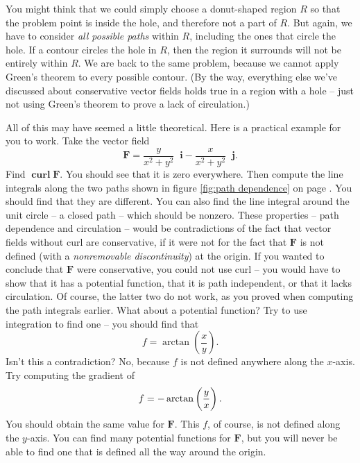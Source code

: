 \documentclass{myarticle}
\DeclareMathOperator{\curl}{\mathbf{curl}}
\renewcommand{\vec}[1]{\mathbf{#1}}
\newcommand{\unitvector}[1]{
  \mathop{}\!\vec{#1}
}
\newcommand{\ih}{\unitvector{i}}
\newcommand{\jh}{\unitvector{j}}
\theoremstyle{nospace}
\newtheorem{old series theorem}{Theorem}
\newenvironment{series theorem}
{\begin{mdframed}\begin{old series theorem}}
    {\end{old series theorem}\end{mdframed}}
\begin{document}
You might think that we could simply choose a donut-shaped region $R$
so that the problem point is inside the hole, and therefore not a part
of $R$. But again, we have to consider \emph{all possible paths}
within $R$, including the ones that circle the hole. If a contour
circles the hole in $R$, then the region it surrounds will not be
entirely within $R$. We are back to the same problem, because we
cannot apply Green's theorem to every possible contour. (By the way,
everything else we've discussed about conservative vector fields holds
true in a region with a hole -- just not using Green's theorem to
prove a lack of circulation.)

All of this may have seemed a little theoretical. Here is a practical
example for you to work. Take the vector field
\[
  \vec{F} = \frac{y}{x^2 + y^2} \ih - \frac{x}{x^2 + y^2} \jh.
\]
Find $\curl \vec{F}$. You should see that it is zero everywhere. Then
compute the line integrals along the two paths shown in figure
\ref{fig:path dependence} on page \pageref{fig:path dependence}. You
should find that they are different. You can also find the line
integral around the unit circle -- a closed path -- which should be
nonzero. These properties -- path dependence and circulation -- would
be contradictions of the fact that vector fields without curl are
conservative, if it were not for the fact that $\vec{F}$ is not
defined (with a \textit{nonremovable discontinuity}) at the origin. If
you wanted to conclude that $\vec{F}$ were conservative, you could not
use curl -- you would have to show that it has a potential function,
that it is path independent, or that it lacks circulation. Of course,
the latter two do not work, as you proved when computing the path
integrals earlier. What about a potential function? Try to use
integration to find one -- you should find that
\[
  f = \arctan\left(\frac{x}{y}\right).
\]
Isn't this a contradiction? No, because $f$ is not defined anywhere
along the $x$-axis. Try computing the gradient of
\[
  f = -\arctan\left(\frac{y}{x\vphantom{y}}\right).
\]
You should obtain the same value for $\vec{F}$. This $f$, of course,
is not defined along the $y$-axis. You can find many potential
functions for $\vec{F}$, but you will never be able to find one that
is defined all the way around the origin.
\end{document}
